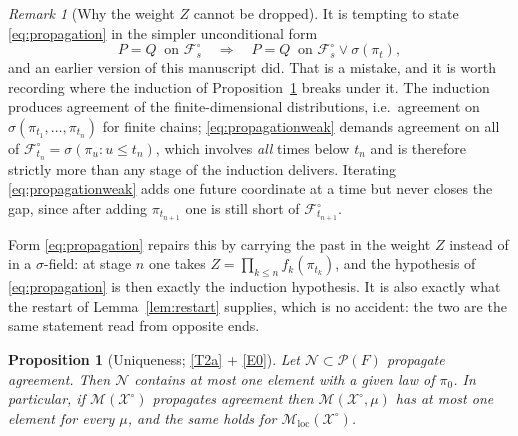 \documentclass[11pt,a4paper]{article}
\theoremstyle{plain}
\newtheorem{proposition}[theorem]{Proposition}
\theoremstyle{definition}
\theoremstyle{remark}
\newtheorem{remark}[theorem]{Remark}
\newcommand{\Prob}{\mathcal{P}}                %
\newcommand{\Filt}{\mathcal{F}}
\newcommand{\XX}{\mathcal{X}}                  %
\newcommand{\Msol}{\mathcal{M}}
\begin{document}
\begin{remark}[Why the weight $Z$ cannot be dropped]
  \label{rem:whyZ}
  It is tempting to state \eqref{eq:propagation} in the simpler unconditional
  form
  \begin{equation}
    \label{eq:propagationweak}
    P = Q \ \text{ on } \Filt^\circ_s
    \quad \Longrightarrow \quad
    P = Q \ \text{ on } \Filt^\circ_s \vee \sigma(\pi_t) ,
  \end{equation}
  and an earlier version of this manuscript did.  That is a mistake, and it is
  worth recording where the induction of Proposition~\ref{prop:uniqfromprop}
  breaks under it.  The induction produces agreement of the finite-dimensional
  distributions, i.e.\ agreement on $\sigma(\pi_{t_1},\dots,\pi_{t_n})$ for finite
  chains; \eqref{eq:propagationweak} demands agreement on all of
  $\Filt^\circ_{t_n} = \sigma(\pi_u : u \leq t_n)$, which involves \emph{all}
  times below $t_n$ and is therefore strictly more than any stage of the
  induction delivers.  Iterating \eqref{eq:propagationweak} adds one future
  coordinate at a time but never closes the gap, since after adding $\pi_{t_{n+1}}$
  one is still short of $\Filt^\circ_{t_{n+1}}$.

  Form \eqref{eq:propagation} repairs this by carrying the past in the weight $Z$
  instead of in a $\sigma$-field: at stage $n$ one takes
  $Z = \prod_{k\leq n} f_k(\pi_{t_k})$, and the hypothesis of
  \eqref{eq:propagation} is then exactly the induction hypothesis.  It is also
  exactly what the restart of Lemma~\ref{lem:restart} supplies, which is no
  accident: the two are the same statement read from opposite ends.
\end{remark}

\begin{proposition}[Uniqueness; \eqref{T2a} + \eqref{E0}]
  \label{prop:uniqfromprop}
  Let $\mathcal{N} \subset \Prob(F)$ propagate agreement.  Then $\mathcal{N}$
  contains at most one element with a given law of $\pi_0$.  In particular, if
  $\Msol(\XX^\circ)$ propagates agreement then $\Msol(\XX^\circ,\mu)$ has at most
  one element for every $\mu$, and the same holds for
  $\Msol_{\mathrm{loc}}(\XX^\circ)$.
\end{proposition}
\end{document}
